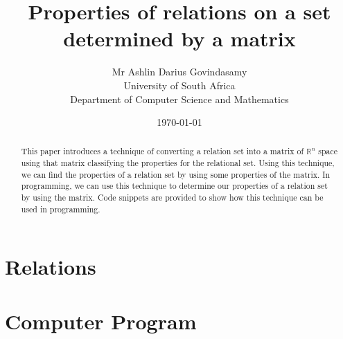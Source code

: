 \documentclass{report}
\title{Properties of relations on a set determined by a matrix}
\author{Mr Ashlin Darius Govindasamy\\ \large{University of South Africa} \\ \large{Department of Computer Science and Mathematics}}
\date{\today}
\begin{document}
\maketitle
\newpage


\begin{abstract}
This paper introduces a technique of converting a relation set into a matrix of $\mathbb{R}^{n}$ space using that matrix classifying the properties for the relational set.
Using this technique, we can find the properties of a relation set by using some properties of the matrix. In programming, we can use this technique to determine our properties of a relation set by using the matrix. Code snippets are provided to show how this technique can be used in programming.
\end{abstract}

\newpage
\tableofcontents



\chapter{Relations}


\chapter{Computer Program}


\newpage
\end{document}

